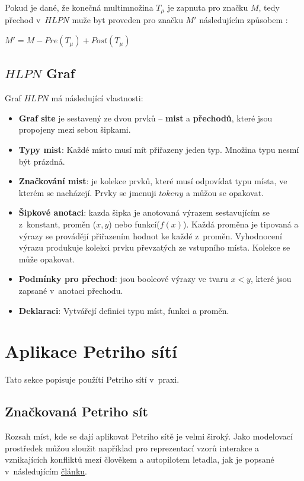 Pokud je dané, že konečná multimnožina $T_\mu$ je zapnuta pro značku $M$, tedy přechod v~$HLPN$ muže byt proveden pro značku $M'$ následujícím způsobem \cite[p.~12]{pnstd54}:
\begin{center}
  $M' = M - Pre(T_\mu) + Post(T_\mu)$
\end{center}


\subsection{$HLPN$ Graf}
\label{subsec:hlpn-graph}

Graf $HLPN$ má následující vlastnosti:
\begin{itemize}
  \item \textbf{Graf site} je sestavený ze dvou prvků -- \textbf{mist} a \textbf{přechodů}, které jsou propojeny mezi sebou šipkami.
  \item \textbf{Typy mist}: Každé místo musí mít přiřazeny jeden typ. Množina typu nesmí být prázdná.
  \item \textbf{Značkování mist}: je kolekce prvků, které musí odpovídat typu místa, ve kterém se nacházejí. Prvky se jmenuji $tokeny$ a můžou se opakovat.
  \item \textbf{Šipkové anotaci}: kazda šipka je anotovaná výrazem  sestavujícím se z~konstant, proměn ($x, y$) nebo funkcí($f(x)$). Každá proměna je tipovaná a výrazy se provádějí přiřazením hodnot ke každé z~proměn. Vyhodnocení výrazu produkuje kolekci prvku převzatých ze vstupního místa. Kolekce se může opakovat.
  \item \textbf{Podmínky pro přechod}: jsou booleové výrazy ve tvaru $x < y$, které jsou zapsané v~anotaci přechodu.
  \item \textbf{Deklaraci}: Vytvářejí definici typu míst, funkci a proměn.
\end{itemize}

\section{Aplikace Petriho sítí}
\label{sec:pn-application}
Tato sekce popisuje použítí Petriho sítí v~praxi.

\subsection{Značkovaná Petriho sít}
Rozsah míst, kde se dají aplikovat Petriho sítě je velmi široký. Jako modelovací prostředek můžou sloužit například pro reprezentací vzorů interakce a vznikajících konfliktů mezí člověkem a autopilotem letadla, jak je popsané v~následujícím \href{https://www-tandfonline-com.ezproxy.lib.vutbr.cz/doi/full/10.1080/00140139.2013.877597}{článku}.

